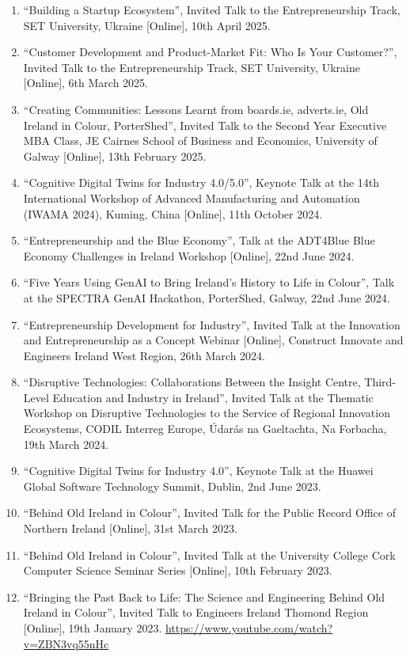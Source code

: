 \documentclass[10pt,a4paper]{res} %
\begin{document}
\begin{resume}
\begin{enumerate} \itemsep -2pt
\item ``Building a Startup Ecosystem'', Invited Talk to the Entrepreneurship Track, SET University, Ukraine [Online], 10th April 2025.
\item ``Customer Development and Product-Market Fit: Who Is Your Customer?'', Invited Talk to the Entrepreneurship Track, SET University, Ukraine [Online], 6th March 2025.
\item ``Creating Communities: Lessons Learnt from boards.ie, adverts.ie, Old Ireland in Colour, PorterShed'', Invited Talk to the Second Year Executive MBA Class, JE Cairnes School of Business and Economics, University of Galway [Online], 13th February 2025.
\item ``Cognitive Digital Twins for Industry 4.0/5.0'', Keynote Talk at the 14th International Workshop of Advanced Manufacturing and Automation (IWAMA 2024), Kuming, China [Online], 11th October 2024.
\item ``Entrepreneurship and the Blue Economy'', Talk at the ADT4Blue Blue Economy Challenges in Ireland Workshop [Online], 22nd June 2024.
\item ``Five Years Using GenAI to Bring Ireland's History to Life in Colour'', Talk at the SPECTRA GenAI Hackathon, PorterShed, Galway, 22nd June 2024.
\item ``Entrepreneurship Development for Industry'', Invited Talk at the Innovation and Entrepreneurship as a Concept Webinar [Online], Construct Innovate and Engineers Ireland West Region, 26th March 2024.
\item ``Disruptive Technologies: Collaborations Between the Insight Centre, Third-Level Education and Industry in Ireland'', Invited Talk at the Thematic Workshop on Disruptive Technologies to the Service of Regional Innovation Ecosystems, CODIL Interreg Europe, \'{U}dar\'{a}s na Gaeltachta, Na Forbacha, 19th March 2024.
\item ``Cognitive Digital Twins for Industry 4.0'', Keynote Talk at the Huawei Global Software Technology Summit, Dublin, 2nd June 2023.
\item ``Behind Old Ireland in Colour'', Invited Talk for the Public Record Office of Northern Ireland [Online], 31st March 2023.
\item ``Behind Old Ireland in Colour'', Invited Talk at the University College Cork Computer Science Seminar Series [Online], 10th February 2023.
\item ``Bringing the Past Back to Life: The Science and Engineering Behind Old Ireland in Colour'', Invited Talk to Engineers Ireland Thomond Region [Online], 19th January 2023. \url{https://www.youtube.com/watch?v=ZBN3vq55nHc}

\end{enumerate}
\end{resume}
\end{document}
